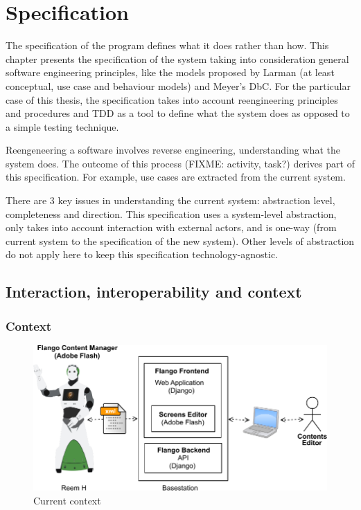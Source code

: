 \chapter{Specification}
The specification of the program defines what it does rather than how.
This chapter presents the specification of the system taking into consideration general software engineering principles, like the models proposed by Larman (at least conceptual, use case and behaviour models) and Meyer's \ac{DbC}.
For the particular case of this thesis, the specification takes into account reengineering principles and procedures and \ac{TDD} as a tool to define what the system does as opposed to a simple testing technique.

Reengeneering a software involves reverse engineering, understanding what the system does.
The outcome of this process (FIXME: activity, task?) derives part of this specification.
For example, use cases are extracted from the current system.

There are 3 key issues in understanding the current system: abstraction level, completeness and direction.
This specification uses a system-level abstraction, only takes into account interaction with external actors, and is one-way (from current system to the specification of the new system).
Other levels of abstraction do not apply here to keep this specification technology-agnostic.

\section{Interaction, interoperability and context}
\label{sec:context}
\subsection{Context}
\begin{figure}[htb]
    \label{fig:context-original}
    \centering
    \includegraphics[width=\textwidth]{figures/context-original}
    \caption{Current context}
\end{figure}

